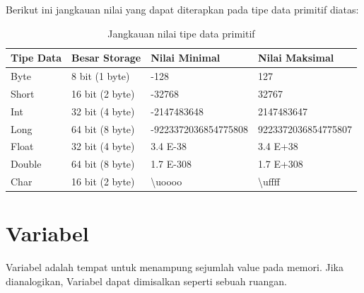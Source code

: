 Berikut ini jangkauan nilai yang dapat diterapkan pada tipe data primitif diatas:
\begin{table}[htbp!]
    \begin{tabular}{|l|l|l|l|}
    \hline
    \rowcolor[HTML]{9AFF99} 
    \textbf{Tipe Data} & \textbf{Besar Storage} & \textbf{Nilai Minimal} & \textbf{Nilai Maksimal} \\ \hline
    Byte               & 8 bit (1 byte)         & -128                   & 127                     \\ \hline
    Short              & 16 bit (2 byte)        & -32768                 & 32767                   \\ \hline
    Int                & 32 bit (4 byte)        & -2147483648            & 2147483647              \\ \hline
    Long               & 64 bit (8 byte)        & -9223372036854775808   & 9223372036854775807     \\ \hline
    Float              & 32 bit (4 byte)        & 3.4 E-38              & 3.4 E+38               \\ \hline
    Double             & 64 bit (8 byte)        & 1.7 E-308             & 1.7 E+308              \\ \hline
    Char               & 16 bit (2 byte)        & \textbackslash{}uoooo  & \textbackslash{}uffff   \\ \hline
    \end{tabular}
    \caption{Jangkauan nilai tipe data primitif}
    \medskip
    \noindent{}
    \medskip
    \end{table}

\newpage
\section{Variabel}
Variabel adalah tempat untuk menampung sejumlah value pada memori. Jika dianalogikan, Variabel dapat dimisalkan seperti sebuah ruangan. 

